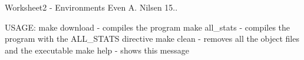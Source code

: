 Worksheet2 -\/ Environments Even A. Nilsen 15..

U\+S\+A\+G\+E\+: make download -\/ compiles the program make all\+\_\+stats -\/ compiles the program with the A\+L\+L\+\_\+\+S\+T\+A\+T\+S directive make clean -\/ removes all the object files and the executable make help -\/ shows this message 